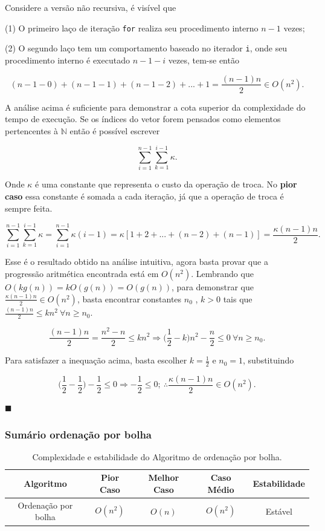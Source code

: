 Considere a versão não recursiva, é visível que 

(1) O primeiro laço de iteração \texttt{for} realiza seu procedimento interno $n-1$ vezes;

(2) O segundo laço tem um comportamento baseado no iterador \texttt{i}, onde seu procedimento interno é executado $n-1-i$ vezes, tem-se então

\[(n-1-0)+(n-1-1)+(n-1-2)+...+1 = \frac{(n-1)n}{2}\in O(n^2).\]

A análise acima é suficiente para demonstrar a cota superior da complexidade do tempo de execução. Se os índices do vetor forem pensados como elementos pertencentes à $\mathbb{N}$ então é possível escrever 

\[\sum_{i=1}^{n-1}\sum_{k=1}^{i-1}\kappa.\]

Onde $\kappa$ é uma constante que representa o custo da operação de troca. No \textbf{pior caso} essa constante é somada a cada iteração, já que a operação de troca é sempre feita.

\[\sum_{i=1}^{n-1}\sum_{k=1}^{i-1}\kappa = \sum_{i=1}^{n-1}\kappa(i-1) = \kappa[1+2+...+(n-2)+(n-1)]=\frac{\kappa(n-1)n}{2}.\]

Esse é o resultado obtido na análise intuitiva, agora basta provar que a progressão aritmética encontrada está em $O(n^2)$. Lembrando que $O(kg(n)) = kO(g(n)) = O(g(n))$, para demonstrar que $\frac{\kappa(n-1)n}{2} \in O(n^2)$, basta encontrar constantes $n_0$ , $k > 0$ tais que $\frac{(n-1)n}{2}\leq kn^2 \ \forall n\geq n_0$.

\[\frac{(n-1)n}{2}=\frac{n^2 - n}{2}\leq kn^2 \Rightarrow \Bigr(\frac{1}{2}-k\Bigr)n^2 - \frac{n}{2}\leq 0 \ \forall n\geq n_0.\]

Para satisfazer a inequação acima, basta escolher $k=\frac{1}{2}$ e $n_0=1$, substituindo

\[\Bigr(\frac{1}{2}-\frac{1}{2}\Bigr) - \frac{1}{2} \leq 0 \Rightarrow-\frac{1}{2} \leq 0; \ \therefore \frac{\kappa(n-1)n}{2}\in O(n^2).\]

{\raggedleft $\blacksquare $ \par}

\subsubsection{Sumário ordenação por bolha}

\begin{table}[h]
\centering
\begin{tabular}{|c|c|c|c|c|}
\hline
\textbf{Algoritmo} & \textbf{Pior Caso} & \textbf{Melhor Caso} & \textbf{Caso Médio} & \textbf{Estabilidade} \\ \hline
Ordenação por bolha       & \(O(n^2)\)         & \(O(n)\)             & \(O(n^2)\)           & Estável                \\ \hline
\end{tabular}
\caption{Complexidade e estabilidade do Algoritmo de ordenação por bolha.}
\label{Sumario bubble sort}
\end{table}
